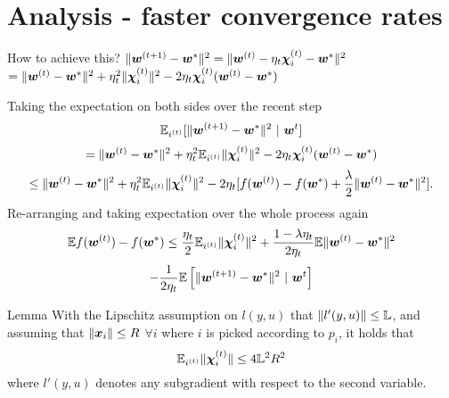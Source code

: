 
\section{Analysis - faster convergence rates}
\begin{frame}{How to achieve this?}
$\|\bm{w}^{(t+1)}-\bm{w}^*\|^2 = \|\bm{w}^{(t)} - \eta_t\bm{\chi}_i^{(t)} - \bm{w}^*\|^2$
$= \|\bm{w}^{(t)} - \bm{w}^*\|^2 + \eta_t^2\|\bm{\chi}_i^{(t)}\|^2 - 2\eta_t\bm{\chi}_i^{(t)}(\bm{w}^{(t)} - \bm{w}^*    )$


Taking the expectation on both sides over the recent step
\[
    \E_{i^{(t)}}[ \|\wv^{(t+1)}-\wv^*\|^2  \ |\  \wv^t ] 
\]
\[
        = \|\bm{w}^{(t)} - \bm{w}^*\|^2 + \eta_t^2\mathbb{E}_{i^{(t)}}\|\bm{\chi}_i^{(t)}\|^2 
    - 2\eta_t\bm{\chi}_i^{(t)}(\bm{w}^{(t)} - \bm{w}^*)
\]
\[
    \le \|\bm{w}^{(t)} - \bm{w}^*\|^2 + \eta_t^2\mathbb{E}_{i^{(t)}}\|\bm{\chi}_i^{(t)}\|^2 - 2\eta_t[f(\bm{w}^{(t)}) -      f(\bm{w}^*) + \frac{\lambda}{2}\|\bm{w}^{(t)}-\bm{w}^*\|^2].
\]
Re-arranging and taking expectation over the whole process again
\[
    \mathbb{E} f(\bm{w}^{(t)})-f(\bm{w}^*) \le \frac{\eta_t}{2}\mathbb{E}_{i^{(t)}}\|\bm{\chi}_i^{(t)}\|^2+\frac{1-\lambda     \eta_t}{2\eta_t} \mathbb{E} \|\bm{w}^{(t)}-\bm{w}^*\|^2 
\]
\[
    - \frac{1}{2\eta_t}\E\left[  \|\wv^{(t+1)} - \wv^*\|^2  \ |\        \wv^t  \right] 
\]
\end{frame}

\begin{frame}{Lemma}
With the Lipschitz assumption on $l(y,u)$ that $\|l'(y,u)\| \le \mathbb{L}$, and assuming that $\|\bm{x}_i\|\le     R$ $\forall i$ where $i$ is picked according to $p_i$, it holds that
\[
    \mathbb{E}_{i^{(t)}} \|\bm{\chi}_i^{(t)}\|\le 4\mathbb{L}^2R^2
\]
where $l'(y,u)$ denotes any subgradient with respect to the second variable.

\end{frame}

